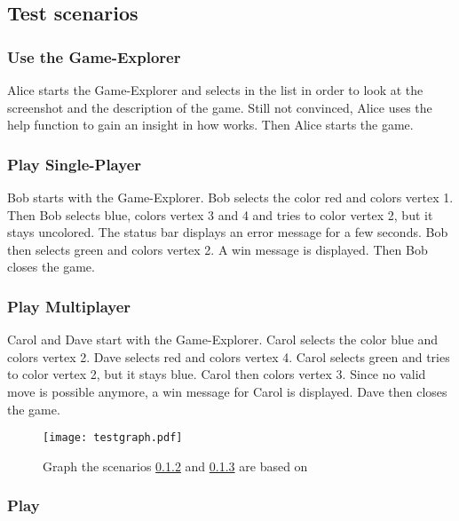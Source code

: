 \subsection{Test scenarios}

\subsubsection{Use the Game-Explorer}

Alice starts the Game-Explorer and selects \graphcoloring in the list in order to look at the screenshot and the description of the game. Still not convinced, Alice uses the help function to gain an insight in how \graphcoloring works. Then Alice starts the game.

\subsubsection{Play \graphcoloring Single-Player} \label{T:GCSingle}

Bob starts \graphcoloring with the Game-Explorer. Bob selects the color red and colors vertex 1. Then Bob selects blue, colors vertex 3 and 4 and tries to color vertex 2, but it stays uncolored. The status bar displays an error message for a few seconds. Bob then selects green and colors vertex 2. A win message is displayed. Then Bob closes the game.

\subsubsection{Play \graphcoloring Multiplayer} \label{T:GCMulti}

Carol and Dave start \graphcoloring with the Game-Explorer. Carol selects the color blue and colors vertex 2. Dave selects red and colors vertex 4. Carol selects green and tries to color vertex 2, but it stays blue. Carol then colors vertex 3. Since no valid move is possible anymore, a win message for Carol is displayed. Dave then closes the game.

\begin{figure}[h!]
	\centering
	\texttt{[image: testgraph.pdf]}
	\caption{Graph the scenarios \ref{T:GCSingle} and \ref{T:GCMulti} are based on}
	\label{img:ACTDEV}
\end{figure}

\subsubsection{Play \twixt} \label{T:TwixT}

